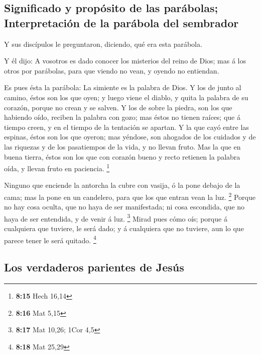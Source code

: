 \hypertarget{significado-y-propuxf3sito-de-las-paruxe1bolas-interpretaciuxf3n-de-la-paruxe1bola-del-sembrador}{%
\subsection{Significado y propósito de las parábolas; Interpretación de
la parábola del
sembrador}\label{significado-y-propuxf3sito-de-las-paruxe1bolas-interpretaciuxf3n-de-la-paruxe1bola-del-sembrador}}

 Y sus discípulos le preguntaron, diciendo, qué era esta
parábola.

 Y él dijo: A vosotros es dado conocer los misterios del
reino de Dios; mas á los otros por parábolas, para que viendo no vean, y
oyendo no entiendan.

 Es pues ésta la parábola: La simiente es la palabra de
Dios.  Y los de junto al camino, éstos son los que oyen;
y luego viene el diablo, y quita la palabra de su corazón, porque no
crean y se salven.  Y los de sobre la piedra, son los que
habiendo oído, reciben la palabra con gozo; mas éstos no tienen raíces;
que á tiempo creen, y en el tiempo de la tentación se apartan.
 Y la que cayó entre las espinas, éstos son los que
oyeron; mas yéndose, son ahogados de los cuidados y de las riquezas y de
los pasatiempos de la vida, y no llevan fruto.  Mas la
que en buena tierra, éstos son los que con corazón bueno y recto
retienen la palabra oída, y llevan fruto en paciencia. \footnote{\textbf{8:15}
  Hech 16,14}

 Ninguno que enciende la antorcha la cubre con vasija, ó
la pone debajo de la cama; mas la pone en un candelero, para que los que
entran vean la luz. \footnote{\textbf{8:16} Mat 5,15} 
Porque no hay cosa oculta, que no haya de ser manifestada; ni cosa
escondida, que no haya de ser entendida, y de venir á luz. \footnote{\textbf{8:17}
  Mat 10,26; 1Cor 4,5}  Mirad pues cómo oís; porque á
cualquiera que tuviere, le será dado; y á cualquiera que no tuviere, aun
lo que parece tener le será quitado. \footnote{\textbf{8:18} Mat 25,29}

\hypertarget{los-verdaderos-parientes-de-jesuxfas}{%
\subsection{Los verdaderos parientes de
Jesús}\label{los-verdaderos-parientes-de-jesuxfas}}

